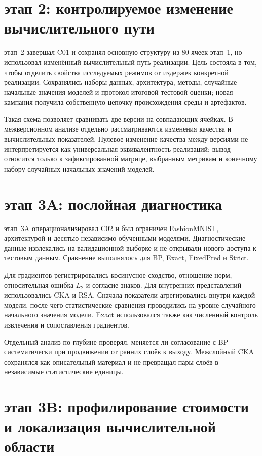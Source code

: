 \section{этап 2: контролируемое изменение вычислительного пути}
\label{sec:stage2-experiment}

этап~2 завершал C01 и сохранял основную структуру из 80 ячеек этап~1, но
использовал
изменённый вычислительный путь реализации. Цель состояла в том, чтобы отделить
свойства исследуемых режимов от издержек конкретной реализации. Сохранялись
наборы данных, архитектура, методы, случайные начальные значения моделей и
протокол итоговой тестовой оценки; новая кампания получила собственную цепочку
происхождения среды и артефактов.

Такая схема позволяет сравнивать две версии на совпадающих ячейках. В
межверсионном анализе отдельно рассматриваются изменения качества и
вычислительных показателей. Нулевое изменение качества между версиями не
интерпретируется как универсальная эквивалентность реализаций: вывод относится
только к зафиксированной матрице, выбранным метрикам и конечному набору
случайных начальных значений моделей.

\section{этап 3A: послойная диагностика}
\label{sec:stage3a-experiment}

этап~3A операционализировал C02 и был ограничен FashionMNIST, архитектурой
 и
десятью независимо обученными моделями. Диагностические данные извлекались на
валидационной выборке и не открывали нового доступа к тестовым данным.
Сравнение выполнялось для BP, Exact, FixedPred и Strict.

Для градиентов регистрировались косинусное сходство, отношение норм,
относительная ошибка $L_2$ и согласие знаков. Для внутренних представлений
использовались CKA и RSA. Сначала показатели агрегировались внутри каждой
модели, после чего статистические сравнения проводились на уровне случайного
начального значения модели. Exact использовался также как численный контроль
извлечения и сопоставления градиентов.

Отдельный анализ по глубине проверял, меняется ли согласование с BP
систематически при продвижении от ранних слоёв к выходу. Межслойный CKA
сохранялся как описательный материал и не превращал пары слоёв в независимые
статистические единицы.

\section{этап 3B: профилирование стоимости и локализация вычислительной области}
\label{sec:stage3b-experiment}

